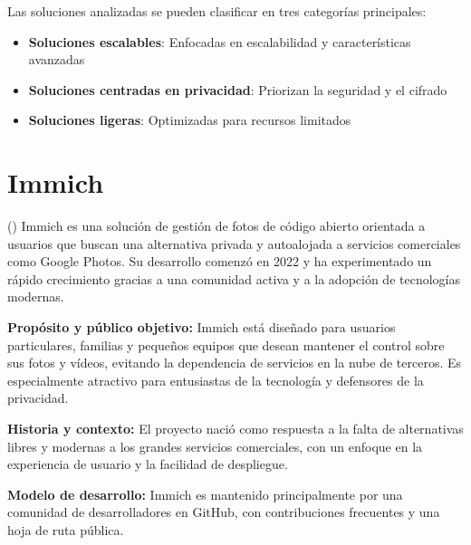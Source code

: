 Las soluciones analizadas se pueden clasificar en tres categorías principales:
\begin{itemize}
    \item \textbf{Soluciones escalables}: Enfocadas en escalabilidad y características avanzadas
    \item \textbf{Soluciones centradas en privacidad}: Priorizan la seguridad y el cifrado
    \item \textbf{Soluciones ligeras}: Optimizadas para recursos limitados
\end{itemize}


\section{Immich}

(\cite{immich-documentation}) Immich es una solución de gestión de fotos de código abierto orientada a usuarios que buscan una alternativa privada y autoalojada a servicios comerciales como Google Photos. Su desarrollo comenzó en 2022 y ha experimentado un rápido crecimiento gracias a una comunidad activa y a la adopción de tecnologías modernas.

\textbf{Propósito y público objetivo:} Immich está diseñado para usuarios particulares, familias y pequeños equipos que desean mantener el control sobre sus fotos y vídeos, evitando la dependencia de servicios en la nube de terceros. Es especialmente atractivo para entusiastas de la tecnología y defensores de la privacidad.

\textbf{Historia y contexto:} El proyecto nació como respuesta a la falta de alternativas libres y modernas a los grandes servicios comerciales, con un enfoque en la experiencia de usuario y la facilidad de despliegue.

\textbf{Modelo de desarrollo:} Immich es mantenido principalmente por una comunidad de desarrolladores en GitHub, con contribuciones frecuentes y una hoja de ruta pública.

